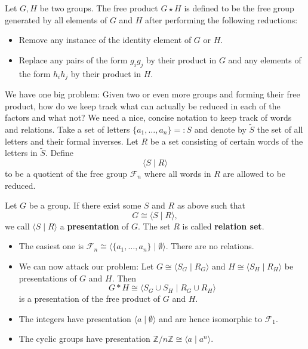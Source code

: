 \begin{definition}
    Let $G,H$ be two groups. The free product $G \star H$ is defined to be the free group generated by all elements of $G$ and $H$ after performing the following reductions:
    \begin{itemize}
        \item Remove any instance of the identity element of $G$ or $H$.
        \item Replace any pairs of the form $g_i g_j$ by their product in $G$ and any elements of the form $h_i h_j$ by their product in $H$.
    \end{itemize}
\end{definition}
We have one big problem: Given two or even more groups and forming their free product, how do we keep track what can actually be reduced in each of the factors and what not? We need a nice, concise notation to keep track of words and relations. 
Take a set of letters $\{a_1, \dots, a_n\}=:S$ and denote by $\tilde{S}$ the set of all letters and their formal inverses. Let $R$ be a set consisting of certain words of the letters in $\tilde{S}$. Define 
$$ \langle S \mid R \rangle$$
to be a quotient of the free group $\mathcal{F}_n$ where all words in $R$ are allowed to be reduced.
\begin{definition}[Presentation]
    Let $G$ be a group. If there exist some $S$ and $R$ as above such that $$G \cong \langle S \mid R \rangle,$$ we call $\langle S \mid R \rangle$ a \textbf{presentation} of $G$. The set $R$ is called \textbf{relation set}.
\end{definition}
\begin{eg}
    \begin{itemize}
        \item The easiest one is $\mathcal{F}_n \cong \langle \{a_1, \dots, a_n\} \mid \emptyset \rangle$. There are no relations.
        \item We can now attack our problem: Let $G \cong \langle S_G \mid R_G \rangle$ and $H \cong \langle S_H \mid R_H \rangle$ be presentations of $G$ and $H$. Then $$G \ast H \cong \langle S_G \cup S_H \mid R_G \cup R_H \rangle $$ is a presentation of the free product of $G$ and $H$.
        \item The integers have presentation $\langle a \mid \emptyset \rangle$ and are hence isomorphic to $\mathcal{F}_1$.
        \item The cyclic groups have presentation $\mathbb{Z} / n \mathbb{Z} \cong \langle a \mid a^n\rangle$.
    \end{itemize}
\end{eg}
